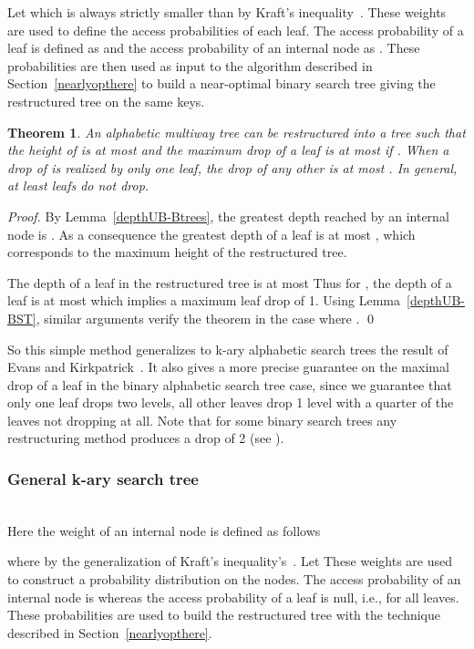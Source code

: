 \documentclass{llncs}\usepackage[english]{babel}
\newtheorem{thm}{Theorem}
\begin{document}
Let  which is always strictly smaller than  by Kraft's inequality~\cite{Kraft}. These weights are used to define the access probabilities of each leaf. The access probability of a leaf  is defined as  and the access probability of an internal node  as . These probabilities are then used as input to the algorithm described in Section~\ref{nearlyopthere} to build a near-optimal binary search tree giving the restructured tree  on the same keys. 

\begin{thm}
\label{dropdepthaddalpha}
An alphabetic multiway tree  can be restructured into a tree  such that the height of  is at most  and the maximum drop of a leaf is at most  if . When  a drop of  is realized by only one leaf, the drop of any other is at most . In general, at least  leafs do not drop.
\end{thm}
\begin{proof}
By Lemma~\ref{depthUB-Btrees}, the greatest depth reached by an internal node is . As a consequence the greatest depth of a leaf is at most , which corresponds to the maximum height of the restructured tree.

The depth of a leaf  in the restructured tree  is at most  Thus for , the depth of a leaf  is at most   which implies a maximum leaf drop of 1. Using Lemma~\ref{depthUB-BST}, similar arguments verify the theorem in the case where .
\qed
\end{proof}

So this simple method generalizes to k-ary alphabetic search trees the result of Evans and Kirkpatrick~\cite{restructuringordered}. It also gives a more precise guarantee on the maximal drop of a leaf in the binary alphabetic search tree case, since we guarantee that only one leaf drops two levels, all other leaves drop 1 level with a quarter of the leaves not dropping at all. Note that for some binary search trees any restructuring method produces a drop of 2 (see \cite{restructuringordered}). 

\subsubsection{General k-ary search tree}
\label{worstdrop}
~\\
Here the weight of an internal node  is defined as follows

where  by the generalization of Kraft's inequality's~\cite{lowerBoundsBST}.  Let  These weights are used to construct a probability distribution on the nodes. The access probability of an internal node  is  whereas the access probability of a leaf is null, i.e.,  for all leaves. These probabilities are used to build the restructured tree  with the technique described in Section~\ref{nearlyopthere}. 
\end{document}
